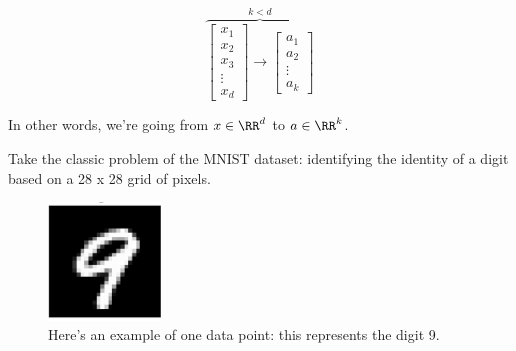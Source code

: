         \begin{equation}
            \overbrace{
            \begin{bmatrix}
                x_1 \\ x_2 \\ x_3 \\ \vdots \\ x_d
            \end{bmatrix}
            \longrightarrow
            \begin{bmatrix}
                a_1 \\ a_2 \\ \vdots \\ a_k
            \end{bmatrix}
            }^{k < d}
        \end{equation}
    
        In other words, we're going from $x \in \RR^d$ to $a \in \RR^k$.
    
        \miniex Take the classic problem of the MNIST dataset: identifying the identity of a digit based on a 28 x 28 grid of pixels.

        \begin{figure}[H]
            \centering
            \includegraphics[width=30mm,scale=0.5]{images/autoencoder_images/mnist_9.png}
            \caption*{Here's an example of one data point: this represents the digit 9.}
        \end{figure}
    
